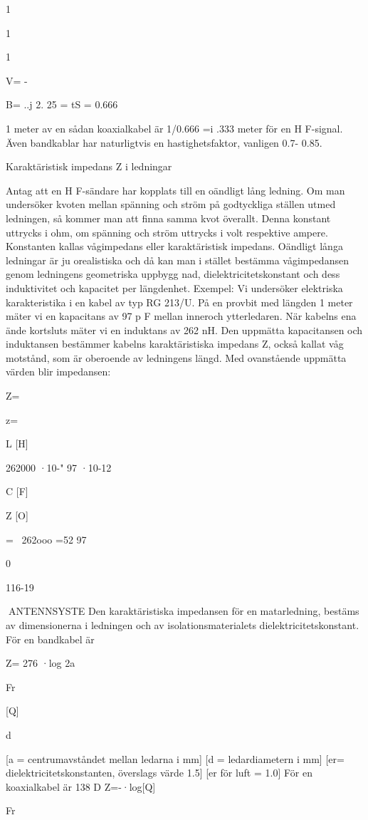 {{{1

1

1

V= -{B= ..j 2. 25 = tS = 0.666

1 meter av en sådan koaxialkabel är
1/0.666 =i .333 meter för en H F-signal.
Även bandkablar har naturligtvis en
hastighetsfaktor, vanligen 0.7- 0.85.

Karaktäristisk impedans Z i ledningar

Antag att en H F-sändare har kopplats till en
oändligt lång ledning. Om man undersöker
kvoten mellan spänning och ström på godtyckliga ställen utmed ledningen, så kommer man att finna samma kvot överallt.
Denna konstant uttrycks i ohm, om spänning och ström uttrycks i volt respektive
ampere. Konstanten kallas vågimpedans
eller karaktäristisk impedans.
Oändligt långa ledningar är ju orealistiska och då kan man i stället bestämma vågimpedansen genom ledningens geometriska uppbygg nad, dielektricitetskonstant
och dess induktivitet och kapacitet per längdenhet.
Exempel:
Vi undersöker elektriska karakteristika i
en kabel av typ RG 213/U.
På en provbit med längden 1 meter mäter vi en kapacitans av 97 p F mellan inneroch ytterledaren. När kabelns ena ände
kortsluts mäter vi en induktans av 262 nH.
Den uppmätta kapacitansen och induktansen bestämmer kabelns karaktäristiska
impedans Z, också kallat våg motstånd, som
är oberoende av ledningens längd.
Med ovanstående uppmätta värden blir
impedansen:

Z=\ 

z=

L [H]

262000 ·10-"
97 ·10-12

C [F]

Z [O]

=~ 262ooo =52
97

0

116-19

ANTENNSYSTE
Den karaktäristiska impedansen för en
matarledning, bestäms av dimensionerna i
ledningen och av isolationsmaterialets dielektricitetskonstant.
För en bandkabel är

Z= 276 ·log 2a

Fr

[Q]

d

[a = centrumavståndet mellan ledarna i
mm]
[d = ledardiametern i mm]
[er= dielektricitetskonstanten, överslags
värde 1.5]
[er för luft = 1.0]
För en koaxialkabel är
138
D
Z=-·log[Q]

Fr

}}}}
